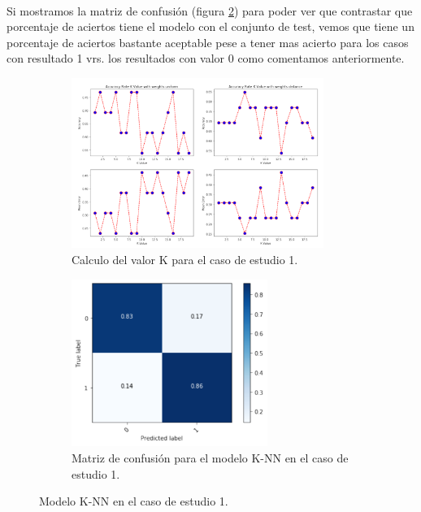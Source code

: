 \paragraph{}
Si mostramos la matriz de confusión (figura \ref{knnCMCase1}) para poder ver que contrastar que porcentaje de aciertos tiene el modelo con el conjunto de test, vemos que tiene un porcentaje de aciertos bastante aceptable pese a tener mas acierto para los casos con resultado 1 vrs. los resultados con valor 0 como comentamos anteriormente.

\begin{figure}[!htb]
    \begin{subfigure}[b]{0.45\linewidth}
    	\centering
	    \includegraphics[width=0.9\textwidth]{images/resultados_knn_ent_conjunto1.png}
    	\caption{Calculo del valor K para el caso de estudio 1.}
		\label{knnTrainCase1}
	\end{subfigure}
	\begin{subfigure}[b]{0.45\linewidth} 
		\centering
		\includegraphics[width=0.7\textwidth]{images/resultados_knn_cm_conjunto1.png}
		\caption{Matriz de confusión para el modelo K-NN en el caso de estudio 1.}
		\label{knnCMCase1}
	\end{subfigure}
	\caption{Modelo K-NN en el caso de estudio 1.}
	\label{knnCase1}
\end{figure}

